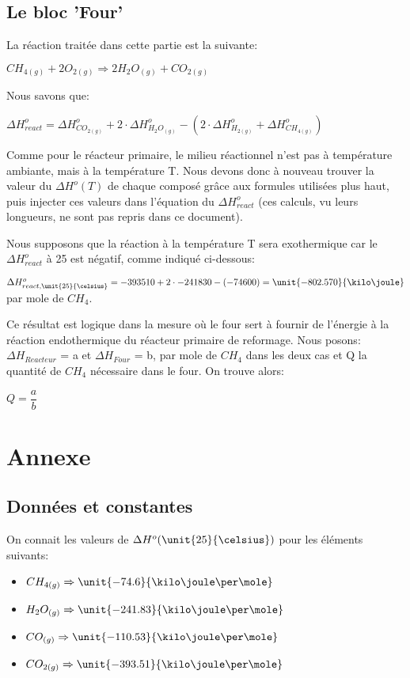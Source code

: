 \documentclass[11pt,a4paper]{report}
\begin{document}
\subsection*{Le bloc 'Four'}
La réaction traitée dans cette partie est la suivante:

$CH_{4(g)} + 2O_{2(g)} \Rightarrow 2H_{2}O_{(g)} + CO_{2(g)}$

Nous savons que:

$\Delta H^o_{react} = \Delta H^o_{CO_{2(g)}} + 2\cdot \Delta H^o_{H_{2}O_{(g)}} - (2\cdot \Delta H^o_{H_{2(g)}} + \Delta H^o_{CH_{4(g)}}) $

Comme pour le réacteur primaire, le milieu réactionnel n'est pas à température ambiante, mais à la température T. Nous devons donc à nouveau trouver la valeur du $\Delta H^o(T)$ de chaque composé grâce aux formules utilisées plus haut, puis injecter ces valeurs dans l'équation du $\Delta H^o_{react}$ (ces calculs, vu leurs longueurs, ne sont pas repris dans ce document).

Nous supposons que la réaction à la température T sera exothermique car le $\Delta H^o_{react}$ à \unit{25}{\celsius} est négatif, comme indiqué ci-dessous:

$\Delta H^o_{react, \unit{25}{\celsius}} = -393510 + 2\cdot -241830 - (-74600) = \unit{-802.570}{\kilo\joule}$ par mole de $CH_4$.

Ce résultat est logique dans la mesure où le four sert à fournir de l'énergie à la réaction endothermique du réacteur primaire de reformage.
Nous posons:$\Delta H_{Reacteur}$  = a et $\Delta H_{Four}$  = b, par mole de $CH_4$ dans les deux cas et Q  la quantité de $CH_4$ nécessaire dans le four.
On trouve alors:

$Q = \dfrac{a}{b}$



\section*{Annexe}
\subsection*{Données et constantes}
On connait les valeurs de $\Delta H^o (\unit{25}{\celsius})$ pour les éléments suivants:
\begin{itemize}
\item{$CH_{4(g)} \Rightarrow \unit{-74.6}{\kilo\joule\per\mole}$}
\item{$H_2O_{(g)} \Rightarrow \unit{-241.83}{\kilo\joule\per\mole}$}
\item{$CO_{(g)} \Rightarrow \unit{-110.53}{\kilo\joule\per\mole}$}
\item{$CO_{2(g)} \Rightarrow \unit{-393.51}{\kilo\joule\per\mole}$}
\end{itemize}
\end{document}
